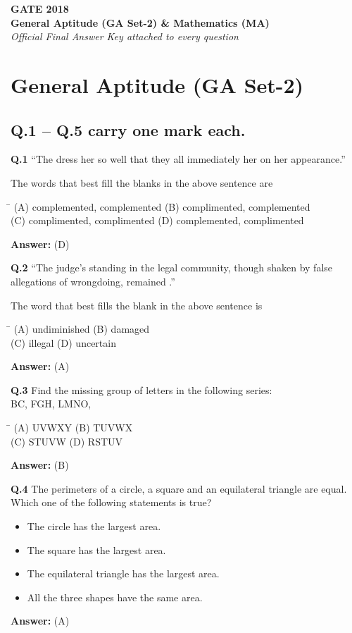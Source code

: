 \documentclass[11pt,a4paper]{article}
\newcommand{\optsfourA}[4]{%
  \begin{tabbing}
    \hspace{0.48\linewidth}\=\kill
    (A) #1 \> (B) #2 \\[2pt]
    (C) #3 \> (D) #4
  \end{tabbing}%
}
\newcommand{\optslistA}[4]{%
  \begin{itemize}
    \setlength{\itemsep}{2pt}\setlength{\parskip}{0pt}
    \item[(A)] #1
    \item[(B)] #2
    \item[(C)] #3
    \item[(D)] #4
  \end{itemize}%
}
\newcommand{\ans}[1]{\textbf{Answer:} #1\par\medskip}
\begin{document}

\begin{center}
  {\LARGE\bfseries GATE 2018}\\[4pt]
  {\large\bfseries General Aptitude (GA Set-2) \& Mathematics (MA)}\\[2pt]
  {\small\itshape Official Final Answer Key attached to every question}
\end{center}
\medskip

\section*{General Aptitude (GA Set-2)}

\subsection*{Q.1 -- Q.5 carry one mark each.}

\textbf{Q.1} ``The dress \underline{\hspace{2cm}} her so well that they all immediately \underline{\hspace{2cm}} her on her appearance.''

The words that best fill the blanks in the above sentence are
\optsfourA{complemented, complemented}{complimented, complemented}{complimented, complimented}{complemented, complimented}
\ans{(D)}

\textbf{Q.2} ``The judge's standing in the legal community, though shaken by false allegations of wrongdoing, remained \underline{\hspace{2cm}}.''

The word that best fills the blank in the above sentence is
\optsfourA{undiminished}{damaged}{illegal}{uncertain}
\ans{(A)}

\textbf{Q.3} Find the missing group of letters in the following series:\\
BC, FGH, LMNO, \underline{\hspace{2cm}}
\optsfourA{UVWXY}{TUVWX}{STUVW}{RSTUV}
\ans{(B)}

\textbf{Q.4} The perimeters of a circle, a square and an equilateral triangle are equal. Which one of the following statements is true?
\optslistA{The circle has the largest area.}{The square has the largest area.}{The equilateral triangle has the largest area.}{All the three shapes have the same area.}
\ans{(A)}
\end{document}
